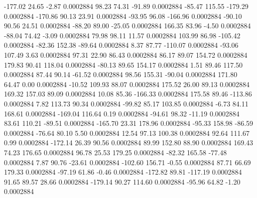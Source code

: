      -177.02       24.65       -2.87     0.0002884
       98.23       74.31      -91.89     0.0002884
      -85.47      115.55     -179.29     0.0002884
     -170.86       90.13       23.91     0.0002884
      -93.95       96.08     -166.96     0.0002884
      -90.10       90.56       24.51     0.0002884
      -88.20       89.00      -25.05     0.0002884
      166.35       83.96       -4.50     0.0002884
      -88.04       74.42       -3.09     0.0002884
       79.98       98.11       11.57     0.0002884
      103.99       86.98     -105.42     0.0002884
      -82.36      152.38      -89.64     0.0002884
        8.37       87.77     -110.07     0.0002884
      -93.06      107.49        3.63     0.0002884
       97.31       22.90       86.43     0.0002884
       86.17       89.07      154.72     0.0002884
      179.83       90.41      118.04     0.0002884
      -80.13       89.65      154.17     0.0002884
        1.51       89.46      117.50     0.0002884
       87.44       90.14      -61.52     0.0002884
       98.56      155.31      -90.04     0.0002884
      171.80       64.47        0.00     0.0002884
      -10.52      109.93       88.07     0.0002884
      175.52       26.00       89.13     0.0002884
      169.32      157.03       89.09     0.0002884
       10.08       85.36     -166.33     0.0002884
      175.58       89.46     -113.86     0.0002884
        7.82      113.73       90.34     0.0002884
      -99.82       85.17      103.85     0.0002884
       -6.73       84.11      168.61     0.0002884
     -169.04      116.64        0.19     0.0002884
      -94.61       98.32      -11.19     0.0002884
       83.61      110.21      -89.51     0.0002884
     -165.70       23.31      178.96     0.0002884
      -95.33      158.98      -86.59     0.0002884
      -76.64       80.10        5.50     0.0002884
       12.54       97.13      100.38     0.0002884
       92.64      111.67        0.99     0.0002884
     -172.14       26.39       90.56     0.0002884
       89.99      152.80       88.90     0.0002884
      169.43       74.23      176.65     0.0002884
       96.78       25.53      179.25     0.0002884
      -82.32      165.58      -77.48     0.0002884
        7.87       90.76      -23.61     0.0002884
     -102.60      156.71       -0.55     0.0002884
       87.71       66.69      179.33     0.0002884
      -97.19       61.86       -0.46     0.0002884
     -172.82       89.81     -117.19     0.0002884
       91.65       89.57       28.66     0.0002884
     -179.14       90.27      114.60     0.0002884
      -95.96       64.82       -1.20     0.0002884
